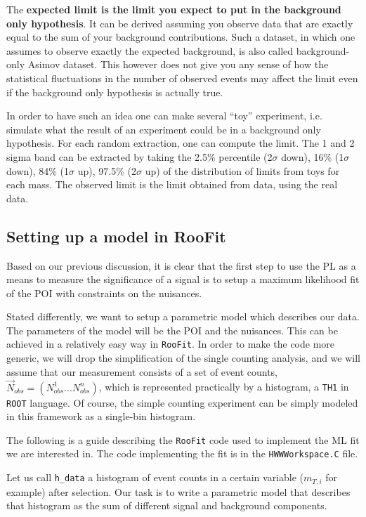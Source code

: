 \documentclass[a4paper,12pt]{article}
\begin{document}
The {\bf expected limit is the limit you expect to put in the background
only hypothesis}. It can be derived assuming you observe data that are exactly
equal to the sum of your background contributions. Such a dataset, in which one
assumes to observe exactly the expected background, is also called
background-only Asimov dataset. 
This however does not give you any sense of how the statistical fluctuations
in the number of observed events may affect the limit even if the background
only hypothesis is actually true. 

In order to have such an idea one can make several
``toy'' experiment, i.e. simulate what the result of an
experiment  could be in a background only hypothesis. For each random
extraction, one can compute the limit. The  1 and 2 sigma band can be
extracted by taking the 2.5\% percentile (2$\sigma$ down), 16\% (1$\sigma$ down), 84\% (1$\sigma$ up), 97.5\%
(2$\sigma$ up) of the distribution of limits from toys for each mass.
The observed limit is the limit obtained from data, using the real data.


\subsection{Setting up a model in RooFit}
Based on our previous discussion, it is clear that the first step to use the
PL as a means to measure the significance of a signal is to setup a maximum
likelihood fit of the POI with constraints on the nuisances.

Stated differently, we want to setup a parametric model which describes our
data. The parameters of the model will be the POI and the nuisances. This can
be achieved in a relatively easy way in \verb+RooFit+. In order to make the
code more generic, we will drop the simplification of the single counting
analysis, and we will assume that our measurement consists of a set of event counts,
$\vec{N}_{obs}=(N_{obs}^1...N_{obs}^n)$, which is represented practically by a
histogram, a \verb+TH1+ in \verb+ROOT+ language. Of course, the simple
counting experiment can be simply modeled in this framework as a single-bin
histogram.

The following is a guide describing the \verb+RooFit+ code used to implement the ML
fit we are interested in. The code implementing the fit is in the
\verb+HWWWorkspace.C+ file.

Let us call \verb+h_data+ a histogram of event counts in a certain variable
($m_{T,i}$ for example) after selection. Our task is to write a parametric
model that describes that histogram as the sum of different signal and
background components. 
\end{document}

